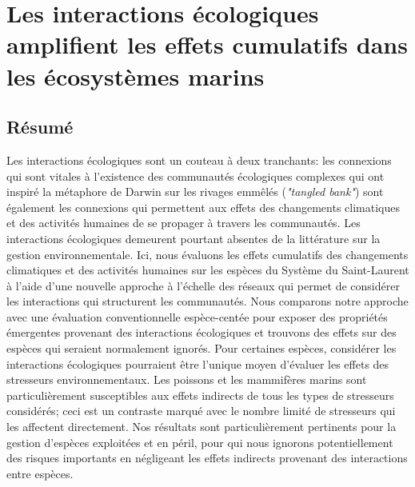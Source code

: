 \chapter{Les interactions écologiques amplifient les effets cumulatifs dans les écosystèmes marins}
\label{chap5}

\section{Résumé}

Les interactions écologiques sont un couteau à deux tranchants: les connexions qui sont vitales à l’existence des communautés écologiques complexes qui ont inspiré la métaphore de Darwin sur les rivages emmêlés (\textit{"tangled bank"}) sont également les connexions qui permettent aux effets des changements climatiques et des activités humaines de se propager à travers les communautés. Les interactions écologiques demeurent pourtant absentes de la littérature sur la gestion environnementale. Ici, nous évaluons les effets cumulatifs des changements climatiques et des activités humaines sur les espèces du Système du Saint-Laurent à l’aide d’une nouvelle approche à l’échelle des réseaux qui permet de considérer les interactions qui structurent les communautés. Nous comparons notre approche avec une évaluation conventionnelle espèce-centée pour exposer des propriétés émergentes provenant des interactions écologiques et trouvons des effets sur des espèces qui seraient normalement ignorés. Pour certaines espèces, considérer les interactions écologiques pourraient être l’unique moyen d’évaluer les effets des stresseurs environnementaux. Les poissons et les mammifères marins sont particulièrement susceptibles aux effets indirects de tous les types de stresseurs considérés; ceci est un contraste marqué avec le nombre limité de stresseurs qui les affectent directement. Nos résultats sont particulièrement pertinents pour la gestion d’espèces exploitées et en péril, pour qui nous ignorons potentiellement des risques importants en négligeant les effets indirects provenant des interactions entre espèces.

